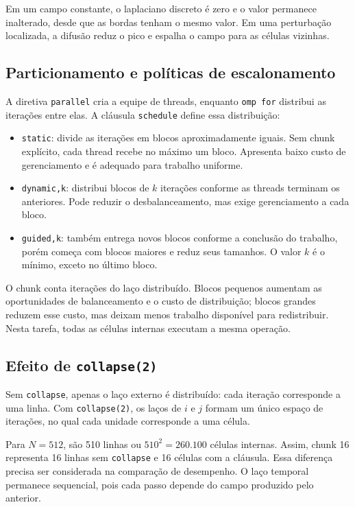 \documentclass[11pt,letterpaper]{article}
\begin{document}
Em um campo constante, o laplaciano discreto é zero e o valor permanece inalterado, desde que as bordas tenham o mesmo valor. Em uma perturbação localizada, a difusão reduz o pico e espalha o campo para as células vizinhas.

\subsection{Particionamento e políticas de escalonamento}
A diretiva \texttt{parallel} cria a equipe de threads, enquanto \texttt{omp for} distribui as iterações entre elas. A cláusula \texttt{schedule} define essa distribuição:
\begin{itemize}
\item \texttt{static}: divide as iterações em blocos aproximadamente iguais. Sem chunk explícito, cada thread recebe no máximo um bloco. Apresenta baixo custo de gerenciamento e é adequado para trabalho uniforme.
\item \texttt{dynamic,k}: distribui blocos de $k$ iterações conforme as threads terminam os anteriores. Pode reduzir o desbalanceamento, mas exige gerenciamento a cada bloco.
\item \texttt{guided,k}: também entrega novos blocos conforme a conclusão do trabalho, porém começa com blocos maiores e reduz seus tamanhos. O valor $k$ é o mínimo, exceto no último bloco.
\end{itemize}
O chunk conta iterações do laço distribuído. Blocos pequenos aumentam as oportunidades de balanceamento e o custo de distribuição; blocos grandes reduzem esse custo, mas deixam menos trabalho disponível para redistribuir. Nesta tarefa, todas as células internas executam a mesma operação.

\subsection{Efeito de \texttt{collapse(2)}}
Sem \texttt{collapse}, apenas o laço externo é distribuído: cada iteração corresponde a uma linha. Com \texttt{collapse(2)}, os laços de $i$ e $j$ formam um único espaço de iterações, no qual cada unidade corresponde a uma célula.

Para $N=512$, são 510 linhas ou $510^2=260.100$ células internas. Assim, chunk 16 representa 16 linhas sem \texttt{collapse} e 16 células com a cláusula. Essa diferença precisa ser considerada na comparação de desempenho. O laço temporal permanece sequencial, pois cada passo depende do campo produzido pelo anterior.
\end{document}
